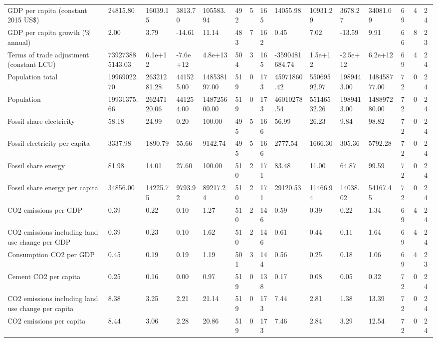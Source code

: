 \begin{longtable}{lllllllllllllll}
GDP per capita (constant 2015 US\$) & 24815.80 & 16039.15 & 3813.70 & 105583.94 & 492 & 5 & 165 & 14055.98 & 10931.29 & 3678.27 & 34081.09 & 69 & 4 & 24\\
\addlinespace
GDP per capita growth (\% annual) & 2.00 & 3.79 & -14.61 & 11.14 & 483 & 7 & 162 & 0.45 & 7.02 & -13.59 & 9.91 & 66 & 8 & 23\\
Terms of trade adjustment (constant LCU) & 739273885143.03 & 6.1e+12 & -7.6e+12 & 4.8e+13 & 504 & 3 & 165 & -3590481684.74 & 1.5e+12 & -2.5e+12 & 6.2e+12 & 69 & 4 & 24\\
Population total & 19969022.70 & 26321281.28 & 441525.00 & 148538197.00 & 519 & 0 & 173 & 45971860.42 & 55069592.97 & 1989443.00 & 148458777.00 & 72 & 0 & 24\\
Population & 19931375.66 & 26247120.06 & 441254.00 & 148725600.00 & 519 & 0 & 173 & 46010278.54 & 55146532.26 & 1989413.00 & 148897280.00 & 72 & 0 & 24\\
Fossil share electricity & 58.18 & 24.99 & 0.20 & 100.00 & 495 & 5 & 166 & 56.99 & 26.23 & 9.84 & 98.82 & 72 & 0 & 24\\
\addlinespace
Fossil electricity per capita & 3337.98 & 1890.79 & 55.66 & 9142.74 & 495 & 5 & 166 & 2777.54 & 1666.30 & 305.36 & 5792.28 & 72 & 0 & 24\\
Fossil share energy & 81.98 & 14.01 & 27.60 & 100.00 & 510 & 2 & 171 & 83.48 & 11.00 & 64.87 & 99.59 & 72 & 0 & 24\\
Fossil share energy per capita & 34856.00 & 14225.75 & 9793.92 & 89217.24 & 510 & 2 & 171 & 29120.53 & 11466.94 & 14038.02 & 54167.45 & 72 & 0 & 24\\
CO2 emissions per GDP & 0.39 & 0.22 & 0.10 & 1.27 & 510 & 2 & 146 & 0.59 & 0.39 & 0.22 & 1.34 & 69 & 4 & 24\\
CO2 emissions including land use change per GDP & 0.39 & 0.23 & 0.10 & 1.62 & 510 & 2 & 146 & 0.61 & 0.44 & 0.11 & 1.64 & 69 & 4 & 24\\
\addlinespace
Consumption CO2 per GDP & 0.45 & 0.19 & 0.19 & 1.19 & 501 & 3 & 144 & 0.56 & 0.25 & 0.18 & 1.06 & 69 & 4 & 23\\
Cement CO2 per capita & 0.25 & 0.16 & 0.00 & 0.97 & 519 & 0 & 138 & 0.17 & 0.08 & 0.05 & 0.32 & 72 & 0 & 24\\
CO2 emissions including land use change per capita & 8.38 & 3.25 & 2.21 & 21.14 & 519 & 0 & 173 & 7.44 & 2.81 & 1.38 & 13.39 & 72 & 0 & 24\\
CO2 emissions per capita & 8.44 & 3.06 & 2.28 & 20.86 & 519 & 0 & 173 & 7.46 & 2.84 & 3.29 & 12.54 & 72 & 0 & 24\\

\end{longtable}
